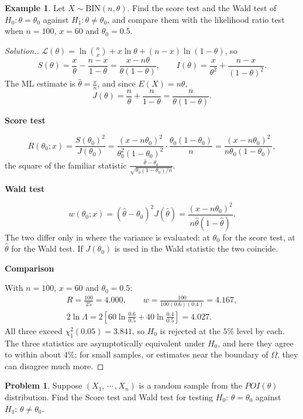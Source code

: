 \documentclass[12pt,a4paper]{report}
\theoremstyle{definition}
\newtheorem{exa}[thm]{Example}
\newcommand{\subhead}[1]{%
  \par\medskip\noindent\textbf{#1}\par\nobreak\smallskip}
\newtheorem{problemx}{Problem}[section]
\newenvironment{problem}{\begin{problemx}}{\end{problemx}}
\newenvironment{solution}
  {\renewcommand{\qedsymbol}{}\begin{proof}[\textit{Solution}.]}
  {\end{proof}}
\begin{document}
\begin{exa}
\label{ex:scorewaldbinomial}
Let $X\sim\text{BIN}(n, \theta)$. Find the score test and the Wald test of
$H_0\colon\theta = \theta_0$ against $H_1\colon\theta\ne\theta_0$, and compare them with the
likelihood ratio test when $n = 100$, $x = 60$ and $\theta_0 = 0.5$.
\end{exa}

\begin{solution}
$\mathcal{L}(\theta) = \ln\binom nx + x\ln\theta + (n - x)\ln(1 - \theta)$, so
\[S(\theta) = \frac x\theta - \frac{n - x}{1 - \theta} = \frac{x - n\theta}{\theta(1 - \theta)},\qquad
I(\theta) = \frac{x}{\theta^2} + \frac{n - x}{(1 - \theta)^2} .\]
The ML estimate is $\hat\theta = \frac xn$, and since $E(X) = n\theta$,
\[J(\theta) = \frac{n}{\theta} + \frac{n}{1 - \theta} = \frac{n}{\theta(1 - \theta)} .\]

\subhead{Score test}
\[R(\theta_0; x) = \frac{S(\theta_0)^2}{J(\theta_0)} = \frac{(x - n\theta_0)^2}{\theta_0^2(1 - \theta_0)^2}\cdot\frac{\theta_0(1 - \theta_0)}{n}
= \frac{(x - n\theta_0)^2}{n\theta_0(1 - \theta_0)},\]
the square of the familiar statistic $\frac{\hat\theta - \theta_0}{\sqrt{\theta_0(1 - \theta_0)/n}}$.

\subhead{Wald test}
\[w(\theta_0; x) = (\hat\theta - \theta_0)^2J(\hat\theta) = \frac{(x - n\theta_0)^2}{n\hat\theta(1 - \hat\theta)} .\]
The two differ only in where the variance is evaluated: at $\theta_0$ for the score
test, at $\hat\theta$ for the Wald test. If $J(\theta_0)$ is used in the Wald statistic the
two coincide.

\subhead{Comparison}
With $n = 100$, $x = 60$ and $\theta_0 = 0.5$:
\begin{gather*}
R = \frac{100}{25} = 4.000,\qquad w = \frac{100}{100(0.6)(0.4)} = 4.167,\\
2\ln\Lambda = 2\left[60\ln\frac{0.6}{0.5} + 40\ln\frac{0.4}{0.5}\right] = 4.027 .
\end{gather*}
All three exceed $\chi^2_1(0.05) = 3.841$, so $H_0$ is rejected at the $5\%$ level by
each. The three statistics are asymptotically equivalent under $H_0$, and here they
agree to within about $4\%$; for small samples, or estimates near the boundary of
$\Omega$, they can disagree much more.
\end{solution}

\begin{problem}
Suppose $(X_1, \, \cdots\, , X_n)$ is a random sample from the $POI(\theta)$ distribution. Find the Score test and Wald test for testing $H_0:\, \theta = \theta_0$ against $H_1:\, \theta \neq \theta_0$.
\end{problem}
\end{document}
